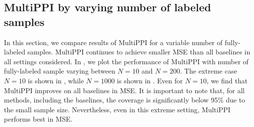 \documentclass{article} %
\begin{document}
\subsection{MultiPPI by varying number of labeled samples}
\label{sec:experiments-num-labeled}
In this section, we compare results of MultiPPI for a variable number of fully-labeled samples. MultiPPI continues to achieve smaller MSE than all baselines in all settings considered. In , we plot the performance of MultiPPI with number of fully-labeled sample varying between $N=10$ and $N=200$. The extreme case $N=10$ is shown in , while  $N=1000$ is shown in . Even for $N=10$, we find that MultiPPI improves on all baselines in MSE. It is important to note that, for all methods, including the baselines, the coverage is significantly below 95\% due to the small sample size. Nevertheless, even in this extreme setting, MultiPPI performs best in MSE.

%   

%   
\end{document}
